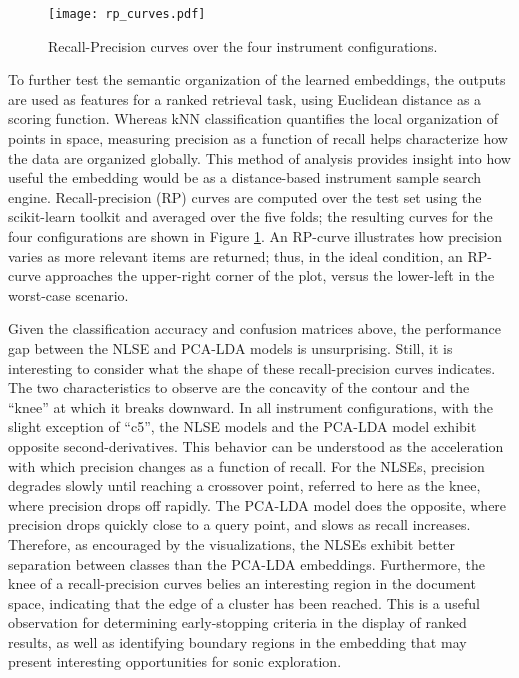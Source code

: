 \begin{figure}[h]
\centering
\texttt{[image: rp\_curves.pdf]}
\caption{Recall-Precision curves over the four instrument configurations.}
\label{fig:rp_curves}
\end{figure}

To further test the semantic organization of the learned embeddings, the outputs are used as features for a ranked retrieval task, using Euclidean distance as a scoring function.
Whereas kNN classification quantifies the local organization of points in space, measuring precision as a function of recall helps characterize how the data are organized globally.
This method of analysis provides insight into how useful the embedding would be as a distance-based instrument sample search engine.
Recall-precision (RP) curves are computed over the test set using the scikit-learn toolkit and averaged over the five folds;
the resulting curves for the four configurations are shown in Figure \ref{fig:rp_curves}.
An RP-curve illustrates how precision varies as more relevant items are returned; thus, in the ideal condition, an RP-curve approaches the upper-right corner of the plot, versus the lower-left in the worst-case scenario.

Given the classification accuracy and confusion matrices above, the performance gap between the NLSE and PCA-LDA models is unsurprising.
Still, it is interesting to consider what the shape of these recall-precision curves indicates.
The two characteristics to observe are the concavity of the contour and the ``knee'' at which it breaks downward.
In all instrument configurations, with the slight exception of ``c5'', the NLSE models and the PCA-LDA model exhibit opposite second-derivatives.
This behavior can be understood as the acceleration with which precision changes as a function of recall.
For the NLSEs, precision degrades slowly until reaching a crossover point, referred to here as the knee, where precision drops off rapidly.
The PCA-LDA model does the opposite, where precision drops quickly close to a query point, and slows as recall increases.
Therefore, as encouraged by the visualizations, the NLSEs exhibit better separation between classes than the PCA-LDA embeddings.
Furthermore, the knee of a recall-precision curves belies an interesting region in the document space, indicating that the edge of a cluster has been reached.
This is a useful observation for determining early-stopping criteria in the display of ranked results, as well as identifying boundary regions in the embedding that may present interesting opportunities for sonic exploration.

